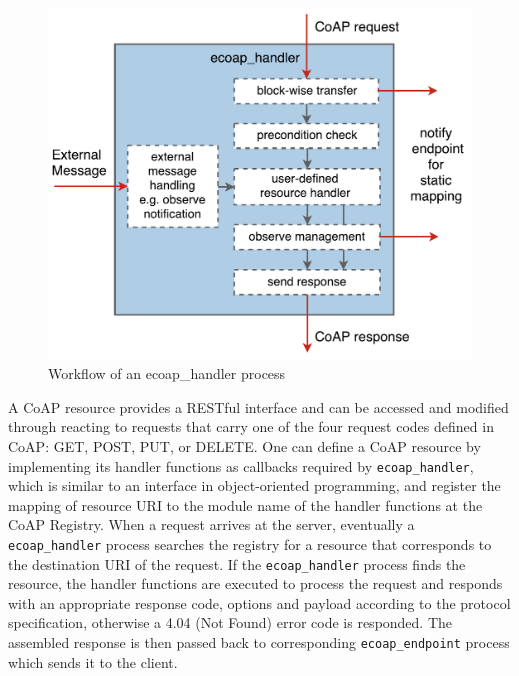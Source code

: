 \begin{figure}[!htbp]
\centering
\includegraphics[scale = 0.55]{ecoap_handler}
\caption{Workflow of an ecoap\_handler process}
\label{fig:ecoap_handler}
\end{figure}

A CoAP resource provides a RESTful interface and can be accessed and modified through reacting to requests that carry one of the four request codes defined in CoAP: GET, POST, PUT, or DELETE. One can define a CoAP resource by implementing its handler functions as callbacks required by \verb|ecoap_handler|, which is similar to an interface in object-oriented programming, and register the mapping of resource URI to the module name of the handler functions at the CoAP Registry. When a request arrives at the server, eventually a \verb|ecoap_handler| process searches the registry for a resource that corresponds to the destination URI of the request. If the \verb|ecoap_handler| process finds the resource, the handler functions are executed to process the request and responds with an appropriate response code, options and payload according to the protocol specification, otherwise a 4.04 (Not Found) error code is responded. The assembled response is then passed back to corresponding \verb|ecoap_endpoint| process which sends it to the client. 

